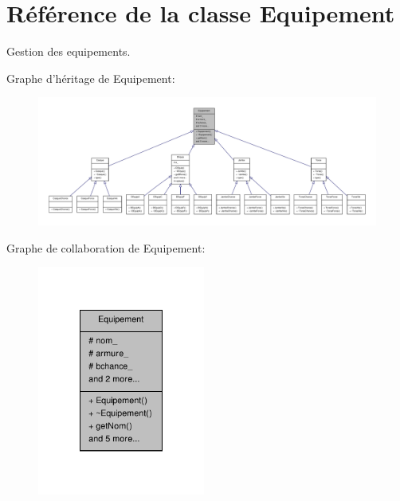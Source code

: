 \hypertarget{class_equipement}{\section{Référence de la classe Equipement}
\label{class_equipement}
}


Gestion des equipements.  




Graphe d'héritage de Equipement\-:
\nopagebreak
\begin{figure}[H]
\begin{center}
\leavevmode
\includegraphics[width=350pt]{class_equipement__inherit__graph}
\end{center}
\end{figure}


Graphe de collaboration de Equipement\-:
\nopagebreak
\begin{figure}[H]
\begin{center}
\leavevmode
\includegraphics[width=156pt]{class_equipement__coll__graph}
\end{center}
\end{figure}
